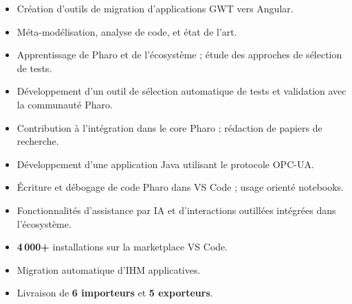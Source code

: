 \documentclass[10pt,a4paper,ragged2e,withhyper]{altacv}
\begin{document}
\divider

\begin{itemize}
  \item Création d’outils de migration d’applications GWT vers Angular.
  \item Méta-modélisation, analyse de code, et état de l’art.
\end{itemize}

\divider

\begin{itemize}
  \item Apprentissage de Pharo et de l’écosystème ; étude des approches de sélection de tests.
  \item Développement d’un outil de sélection automatique de tests et validation avec la communauté Pharo.
  \item Contribution à l’intégration dans le core Pharo ; rédaction de papiers de recherche.
\end{itemize}

\divider

\begin{itemize}
  \item Développement d’une application Java utilisant le protocole OPC-UA.
\end{itemize}


\begin{itemize}
  \item Écriture et débogage de code Pharo dans VS Code ; usage orienté notebooks.
  \item Fonctionnalités d’assistance par IA et d’interactions outillées intégrées dans l’écosystème.
  \item \textbf{4\,000+} installations sur la marketplace VS Code.
\end{itemize}

\divider

\begin{itemize}
  \item Migration automatique d’IHM applicatives.
  \item Livraison de \textbf{6 importeurs} et \textbf{5 exporteurs}.
\end{itemize}
\end{document}
